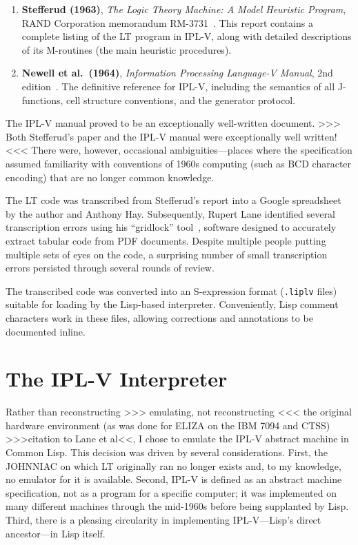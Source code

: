 \documentclass[journal]{IEEEtran}
\begin{document}
\begin{enumerate}
\item \textbf{Stefferud (1963)}, \textit{The Logic Theory Machine: A
  Model Heuristic Program}, RAND Corporation memorandum
  RM-3731~\cite{stefferud1963lt}. This report contains a complete
  listing of the LT program in IPL-V, along with detailed descriptions
  of its M-routines (the main heuristic procedures).

\item \textbf{Newell et al.\ (1964)}, \textit{Information Processing
  Language-V Manual}, 2nd edition~\cite{newell1964iplv}. The
  definitive reference for IPL-V, including the semantics of all
  J-functions, cell structure conventions, and the generator protocol.
\end{enumerate}

The IPL-V manual proved to be an exceptionally well-written
document. >>> Both Stefferud's paper and the IPL-V manual were
exceptionally well written! <<< There were, however, occasional
ambiguities---places where the specification assumed familiarity with
conventions of 1960s computing (such as BCD character encoding) that
are no longer common knowledge.

The LT code was transcribed from Stefferud's report into a Google
spreadsheet by the author and Anthony Hay. Subsequently, Rupert Lane
identified several transcription errors using his ``gridlock''
tool~\cite{lane2024gridlock}, software designed to accurately extract
tabular code from PDF documents. Despite multiple people putting
multiple sets of eyes on the code, a surprising number of small
transcription errors persisted through several rounds of review.

The transcribed code was converted into an S-expression format
(\texttt{.liplv} files) suitable for loading by the Lisp-based
interpreter. Conveniently, Lisp comment characters work in these
files, allowing corrections and annotations to be documented inline.

\section{The IPL-V Interpreter}
\label{sec:interpreter}

Rather than reconstructing >>> emulating, not reconstructing <<< the
original hardware environment (as was done for ELIZA on the IBM 7094
and CTSS) >>>citation to Lane et al<<, I chose to emulate the IPL-V
abstract machine in Common Lisp. This decision was driven by several
considerations. First, the JOHNNIAC on which LT originally ran no
longer exists and, to my knowledge, no emulator for it is
available. Second, IPL-V is defined as an abstract machine
specification, not as a program for a specific computer; it was
implemented on many different machines through the mid-1960s before
being supplanted by Lisp. Third, there is a pleasing circularity in
implementing IPL-V---Lisp's direct ancestor---in Lisp itself.
\end{document}
